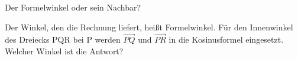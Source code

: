 \setcounter{aufgabe}{10}

\begin{aufgabe}{Der Formelwinkel oder sein Nachbar?}
\begin{teile}
\teil Der Winkel, den die Rechnung liefert, heißt Formelwinkel. Für den Innenwinkel des Dreiecks PQR bei P werden $\overrightarrow{PQ}$ und $\overrightarrow{PR}$ in die Kosinusformel eingesetzt. Welcher Winkel ist die Antwort? \\  \\  \\ 
\end{teile}
\end{aufgabe}

